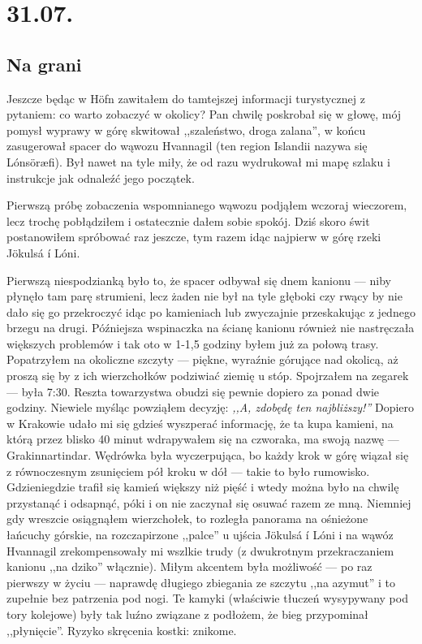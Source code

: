 \chapter*{31.07.}

\section*{Na grani}

Jeszcze będąc w Höfn zawitałem do tamtejszej informacji turystycznej z pytaniem: co warto zobaczyć w okolicy? Pan chwilę poskrobał się w głowę, mój pomysł wyprawy w górę  skwitował ,,szaleństwo, droga zalana'', w końcu zasugerował spacer do wąwozu Hvannagil (ten region Islandii nazywa się Lónsöræfi). Był nawet na tyle miły, że od razu wydrukował mi mapę szlaku i instrukcje jak odnaleźć jego początek.

Pierwszą próbę zobaczenia wspomnianego wąwozu podjąłem wczoraj wieczorem, lecz trochę pobłądziłem i ostatecznie dałem sobie spokój. Dziś skoro świt postanowiłem spróbować raz jeszcze, tym razem idąc najpierw w górę rzeki Jökulsá í Lóni.

Pierwszą niespodzianką było to, że spacer odbywał się dnem kanionu --- niby płynęło tam parę strumieni, lecz żaden nie był na tyle głęboki czy rwący by nie dało się go przekroczyć idąc po kamieniach lub zwyczajnie przeskakując z jednego brzegu na drugi. Późniejsza wspinaczka na ścianę kanionu również nie nastręczała większych problemów i tak oto w 1-1,5 godziny byłem już za połową trasy. Popatrzyłem na okoliczne szczyty --- piękne, wyraźnie górujące nad okolicą, aż proszą się by z ich wierzchołków podziwiać ziemię u stóp. Spojrzałem na zegarek --- była 7:30. Reszta towarzystwa obudzi się pewnie dopiero za ponad dwie godziny. Niewiele myśląc powziąłem decyzję: \emph{,,A, zdobędę ten najbliższy!''} Dopiero w Krakowie udało mi się gdzieś wyszperać informację, że ta kupa kamieni, na którą przez blisko 40 minut wdrapywałem się na czworaka, ma swoją nazwę --- Grakinnartindar. Wędrówka była wyczerpująca, bo każdy krok w górę wiązał się z równoczesnym zsunięciem pół kroku w dół --- takie to było rumowisko. Gdzieniegdzie trafił się kamień większy niż pięść i wtedy można było na chwilę przystanąć i odsapnąć, póki i on nie zaczynał się osuwać razem ze mną. Niemniej gdy wreszcie osiągnąłem wierzchołek, to rozległa panorama na ośnieżone łańcuchy górskie, na rozczapirzone ,,palce'' u ujścia Jökulsá í Lóni i na wąwóz Hvannagil zrekompensowały mi wszlkie trudy (z dwukrotnym przekraczaniem kanionu ,,na dziko'' włącznie). Miłym akcentem była możliwość --- po raz pierwszy w życiu --- naprawdę długiego zbiegania ze szczytu ,,na azymut'' i to zupełnie bez patrzenia pod nogi. Te kamyki (właściwie tłuczeń wysypywany pod tory kolejowe) były tak luźno związane z podłożem, że bieg przypominał ,,płynięcie''. Ryzyko skręcenia kostki: znikome.

